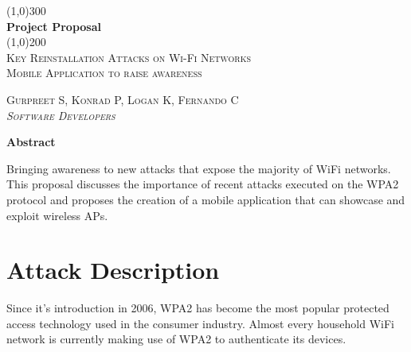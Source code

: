 \documentclass[11pt,]{article}
\begin{document}
\doublespacing

\begin{titlepage}
    \begin{center}
    \line(1,0){300} \\ 
    [0.25in]
    \huge{\bfseries Project Proposal} \\
    [2mm]
    \line(1,0){200} \\
    [1.5cm] 
    \textsc{\Large Key Reinstallation Attacks on Wi-Fi Networks} \\
    [0.75cm]
    \textsc{\Large Mobile Application to raise awareness} \\
    [10cm]
    \end{center}
    
    \begin{flushright}
    \textsc{\Large{Gurpreet S, Konrad P, Logan K, Fernando C \\} \normalsize\emph{Software Developers \\} }
    
    \end{flushright}
    
\end{titlepage}

\newpage

{
\hypersetup{linkcolor=black}
\setcounter{tocdepth}{2}
\tableofcontents
\newpage
}


\begin{center}\textbf{Abstract}\end{center}

\noindent Bringing awareness to new attacks that expose the majority of WiFi
networks. This proposal discusses the importance of recent attacks
executed on the WPA2 protocol and proposes the creation of a mobile
application that can showcase and exploit wireless APs.




\section{Attack Description}\label{attack-description}

Since it's introduction in 2006, WPA2 has become the most popular
protected access technology used in the consumer industry. Almost every
household WiFi network is currently making use of WPA2 to authenticate
its devices.
\end{document}
